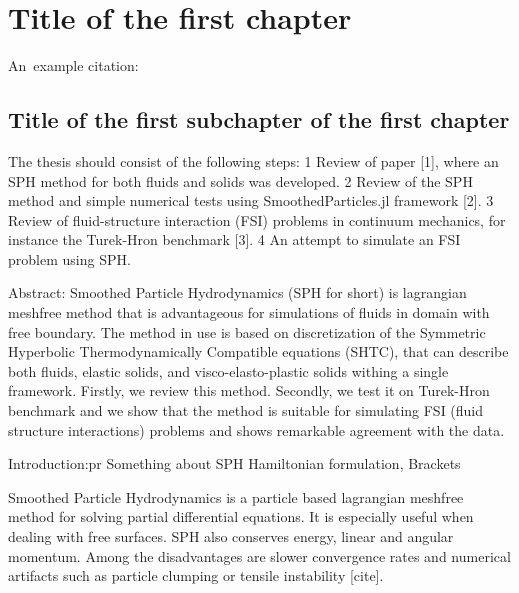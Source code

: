 \chapter{Title of the first chapter}

An~example citation: \cite{Andel07}

\section{Title of the first subchapter of the first chapter}
The thesis should consist of the following steps:
1 Review of paper [1], where an SPH method for both fluids and solids was developed.
2 Review of the SPH method and simple numerical tests using SmoothedParticles.jl framework [2].
3 Review of fluid-structure interaction (FSI) problems in continuum mechanics, for instance the Turek-Hron benchmark [3].
4 An attempt to simulate an FSI problem using SPH.


Abstract:
Smoothed Particle Hydrodynamics (SPH for short) is lagrangian meshfree method that is advantageous 
for simulations of fluids in domain with free boundary. The method in use is based on discretization
of the Symmetric Hyperbolic Thermodynamically Compatible equations (SHTC), that can describe both fluids, elastic solids,
and visco-elasto-plastic solids withing a single framework. Firstly, we review this method. Secondly, we test it on Turek-Hron benchmark and we show that
the method is suitable for simulating FSI (fluid structure interactions) problems and shows remarkable agreement with the data.

Introduction:pr
Something about SPH
Hamiltonian formulation, Brackets

Smoothed Particle Hydrodynamics is a particle based lagrangian meshfree method for solving partial differential equations. 
It is especially useful when dealing with free surfaces. SPH also conserves energy, linear and angular momentum. 
Among the disadvantages are slower convergence rates and numerical artifacts such as particle clumping or tensile instability [cite].



